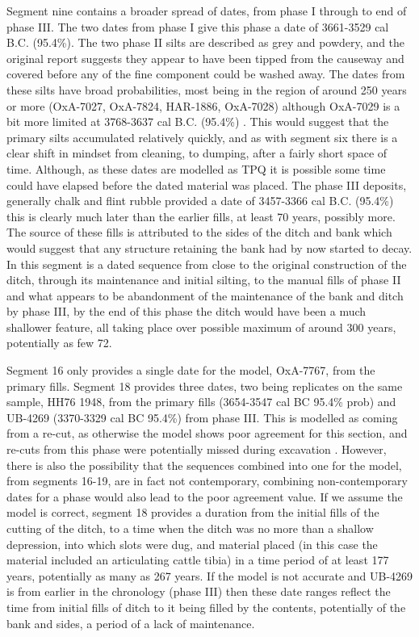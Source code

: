 Segment nine contains a broader spread of dates, from phase I through to end of phase III. The two dates from phase I give this phase a date of 3661-3529 cal B.C. (95.4\%). The two phase II silts are described as grey and powdery, and the original report suggests they appear to have been tipped from the causeway and covered before any of the fine component could be washed away. The dates from these silts have broad probabilities, most being in the region of around 250 years or more (OxA-7027, OxA-7824, HAR-1886, OxA-7028) although OxA-7029 is a bit more limited at 3768-3637 cal B.C. (95.4\%) \citep[81]{Mercer:2008fk}. This would suggest that the primary silts accumulated relatively quickly, and as with segment six there is a clear shift in mindset from cleaning, to dumping, after a fairly short space of time. Although, as these dates are modelled as TPQ it is possible some time could have elapsed before the dated material was placed. The phase III deposits, generally chalk and flint rubble provided a date of 3457-3366 cal B.C. (95.4\%) this is clearly much later than the earlier fills, at least 70 years, possibly more. The source of these fills is attributed to the sides of the ditch and bank \citep[56]{Mercer:2008fk} which would suggest that any structure retaining the bank had by now started to decay. In this segment is a dated sequence from close to the original construction of the ditch, through its maintenance and initial silting, to the manual fills of phase II and what appears to be abandonment of the maintenance of the bank and ditch by phase III, by the end of this phase the ditch would have been a much shallower feature, all taking place over possible maximum of around 300 years, potentially as few 72. 

Segment 16 only provides a single date for the model, OxA-7767, from the primary fills. Segment 18 provides three dates, two being replicates on the same sample, HH76 1948, from the primary fills (3654-3547 cal BC 95.4\% prob) and UB-4269 (3370-3329 cal BC 95.4\%) from phase III. This is modelled as coming from a re-cut, as otherwise the model shows poor agreement for this section, and re-cuts from this phase were potentially missed during excavation \citep[399]{Mercer:2008fk}. However, there is also the possibility that the sequences combined into one for the model, from segments 16-19, are in fact not contemporary, combining non-contemporary dates for a phase would also lead to the poor agreement value. If we assume the model is correct, segment 18 provides a duration from the initial fills of the cutting of the ditch, to a time when the ditch was no more than a shallow depression, into which slots were dug, and material placed (in this case the material included an articulating cattle tibia) in a time period of at least 177 years, potentially as many as 267 years. If the model is not accurate and UB-4269 is from earlier in the chronology (phase III) then these date ranges reflect the time from initial fills of ditch to it being filled by the contents, potentially of the bank and sides, a period of a lack of maintenance.

